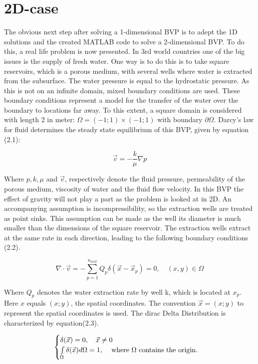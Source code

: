 \documentclass[a4paper]{report}
\begin{document}
\chapter{2D-case}


The obvious next step after solving a 1-dimensional BVP is to adept the 1D solutions and the created MATLAB code to solve a 2-dimensional BVP. To do this, a real life problem is now presented. In 3rd world countries one of the big issues is the supply of fresh water. One way is to do this is to take square reservoirs, which is a porous medium, with several wells where water is extracted from the subsurface. The water pressure is equal to the hydrostatic pressure. As this is not on an infinite domain, mixed boundary conditions are used. These boundary conditions represent a model for the transfer of the water over the boundary to locations far away. To this extent, a square domain is considered with length 2 in meter: $\Omega= (-1; 1) \times (-1; 1)$ with boundary $\partial\Omega$. Darcy's law for fluid determines the steady state equilibrium of this BVP, given by equation (2.1):

\begin{equation}
\vec{v}=-\frac{k}{\mu}\nabla p
\end{equation}
\medskip

Where $ p, k, \mu$ and $\vec{v}$, respectively denote the 
fluid pressure, permeability of the porous medium, viscosity of water and the fluid flow velocity. In this BVP the effect of gravity will not play a part as the problem is looked at in 2D. An accompanying assumption is incompressibility, so the extraction wells are treated as point sinks. This assumption can be made as the well its diameter is much smaller than the dimensions of the square reservoir. The extraction wells extract at the same rate in each direction, leading to the following boundary conditions (2.2).


\begin{equation}
	\nabla\cdot\vec{v}=-\sum_{p=1}^{n_{well}}Q_p\delta(\vec{x}-\vec{x}_p)=0,\quad (x,y) 	\in\Omega 
\end{equation}

Where $Q_p$ denotes the water extraction rate by well k, which is located at $x_p$. Here $x$ equals $(x;y)$, the spatial coordinates.  The convention $\vec{x} = (x; y) $ to represent the spatial coordinates is used. The dirac Delta Distribution is characterized by equation(2.3).

\begin{equation}
	\begin{cases} 
		\delta(\vec{x}) = 0,\quad  \vec{x} \neq 0 \\
		 \int\limits_{\Omega}\delta(\vec{x})d\Omega = 1, \quad $  where $\Omega $  contains the origin.$
	\end{cases} 
\end{equation}
\end{document}
